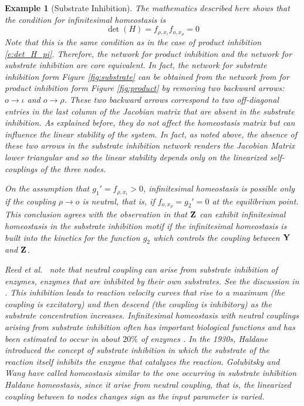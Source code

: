 \documentclass[a4paper,fleqn]{cas-dc}
\newtheorem{example}{Example}[section]
\newcommand{\etal}{\textrm{et al.}}
\begin{document}
\begin{example}[Substrate Inhibition]
The mathematics described here shows that the condition for infinitesimal homeostasis is
\begin{equation} \label{e:det_H_si}
 \det(H) = f_{\rho,x_\iota} f_{o,x_\rho} = 0
\end{equation}
Note that this is the same condition as in the case of product inhibition \eqref{e:det_H_pi}.
Therefore, the network for product inhibition and the network for substrate inhibition are \emph{core equivalent}.
In fact, the network for substrate inhibition form Figure \ref{fig:substrate} can be obtained from the network from for product inhibition form Figure \ref{fig:product}  by removing two backward arrows: $o \to \iota$ and $o \to \rho$.
These two backward arrows correspond to two off-diagonal entries in the last column of the Jacobian matrix that are absent in the substrate inhibition.
As explained before, they do not affect the homeostasis matrix but can influence the linear stability of the system.
In fact, as noted above, the absence of these two arrows in the substrate inhibition network renders the Jacobian Matrix lower triangular and so the linear stability depends only on the linearized self-couplings of the three nodes.

On the assumption that $g_1'= f_{\rho,x_\iota} >0$, infinitesimal homeostasis is possible only if the coupling $\rho\to o$ is neutral, that is, if $f_{o,x_\rho} = g_2' = 0$ at the equilibrium point. 
This conclusion agrees with the observation in \cite{rbgsn2017} that $\bf Z$ can exhibit infinitesimal homeostasis in the substrate inhibition motif if the infinitesimal homeostasis is built into the kinetics for the function $g_2$ which controls the coupling between $\bf Y$ and $\bf Z$.  

Reed \etal~\cite{rbgsn2017} note that neutral coupling can arise from substrate inhibition of enzymes, enzymes that are inhibited by their own substrates.  
See the discussion in \cite{rln2010}.  
This inhibition leads to reaction velocity curves that rise to a maximum (the coupling is excitatory) and then descend (the coupling is inhibitory) as the substrate concentration increases.  Infinitesimal homeostasis with neutral couplings arising from substrate inhibition often has important biological functions and has been estimated to occur in about $20\%$ of enzymes \cite{rln2010}.
In the 1930s, Haldane \cite{haldane1930} introduced the concept of substrate inhibition in which the
substrate of the reaction itself inhibits the enzyme that catalyzes the reaction.
Golubitsky and Wang \cite{wang2020} have called homeostasis similar to the one occurring in substrate inhibition \emph{Haldane homeostasis}, since it arise from neutral coupling, that is, the linearized coupling between to nodes changes sign as the input parameter is varied.


\end{example}
\end{document}
